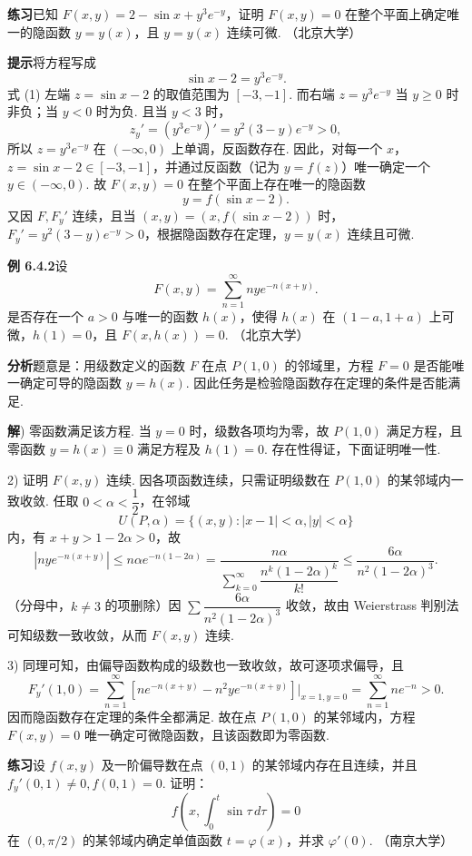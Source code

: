 \documentclass[UTF8, 12pt, fontset=fandol, oneside]{ctexart}
\begin{document}
\noindent\textbf{练习}\quad 已知 $F(x,y)=2-\sin x+y^3e^{-y}$，证明 $F(x,y)=0$ 在整个平面上确定唯一的隐函数 $y=y(x)$，且 $y=y(x)$ 连续可微. （北京大学）

\noindent\textbf{提示}\quad 将方程写成
\begin{equation}
  \sin x-2=y^3e^{-y}.
\end{equation}
式 (1) 左端 $z=\sin x-2$ 的取值范围为 $[-3,-1]$. 而右端 $z=y^3e^{-y}$ 当 $y\ge0$ 时非负；当 $y<0$ 时为负. 且当 $y<3$ 时，
\[
  z_y'=(y^3e^{-y})'=y^2(3-y)e^{-y}>0,
\]
所以 $z=y^3e^{-y}$ 在 $(-\infty,0)$ 上单调，反函数存在. 因此，对每一个 $x$，$z=\sin x-2\in[-3,-1]$，并通过反函数（记为 $y=f(z)$）唯一确定一个 $y\in(-\infty,0)$. 故 $F(x,y)=0$ 在整个平面上存在唯一的隐函数
\[
  y=f(\sin x-2).
\]
又因 $F,F_y'$ 连续，且当 $(x,y)=(x,f(\sin x-2))$ 时，$F_y'=y^2(3-y)e^{-y}>0$，根据隐函数存在定理，$y=y(x)$ 连续且可微.

\noindent\textbf{例 6.4.2}\quad 设
\[
  F(x,y)=\sum_{n=1}^\infty nye^{-n(x+y)}.
\]
是否存在一个 $a>0$ 与唯一的函数 $h(x)$，使得 $h(x)$ 在 $(1-a,1+a)$ 上可微，$h(1)=0$，且 $F(x,h(x))=0$. （北京大学）

\noindent\textbf{分析}\quad 题意是：用级数定义的函数 $F$ 在点 $P(1,0)$ 的邻域里，方程 $F=0$ 是否能唯一确定可导的隐函数 $y=h(x)$. 因此任务是检验隐函数存在定理的条件是否能满足.

\noindent\textbf{解}) 零函数满足该方程. 当 $y=0$ 时，级数各项均为零，故 $P(1,0)$ 满足方程，且零函数 $y=h(x)\equiv0$ 满足方程及 $h(1)=0$. 存在性得证，下面证明唯一性.

2) 证明 $F(x,y)$ 连续. 因各项函数连续，只需证明级数在 $P(1,0)$ 的某邻域内一致收敛. 任取 $0<\alpha<\dfrac12$，在邻域
\[
  U(P,\alpha)=\{(x,y):|x-1|<\alpha,|y|<\alpha\}
\]
内，有 $x+y>1-2\alpha>0$，故
\[
  |nye^{-n(x+y)}|
  \le n\alpha e^{-n(1-2\alpha)}
  =
  \frac{n\alpha}{\sum_{k=0}^\infty\dfrac{n^k(1-2\alpha)^k}{k!}}
  \le
  \frac{6\alpha}{n^2(1-2\alpha)^3}.
\]
（分母中，$k\ne3$ 的项删除）因 $\sum\dfrac{6\alpha}{n^2(1-2\alpha)^3}$ 收敛，故由 Weierstrass 判别法可知级数一致收敛，从而 $F(x,y)$ 连续.

3) 同理可知，由偏导函数构成的级数也一致收敛，故可逐项求偏导，且
\[
  F_y'(1,0)
  =
  \sum_{n=1}^\infty
  \left[
    ne^{-n(x+y)}-n^2ye^{-n(x+y)}
  \right]\bigg|_{x=1,y=0}
  =
  \sum_{n=1}^\infty ne^{-n}>0.
\]
因而隐函数存在定理的条件全都满足. 故在点 $P(1,0)$ 的某邻域内，方程 $F(x,y)=0$ 唯一确定可微隐函数，且该函数即为零函数.

\noindent\textbf{练习}\quad 设 $f(x,y)$ 及一阶偏导数在点 $(0,1)$ 的某邻域内存在且连续，并且 $f_y'(0,1)\ne0,f(0,1)=0$. 证明：
\[
  f\left(x,\int_0^t\sin\tau\,d\tau\right)=0
\]
在 $(0,\pi/2)$ 的某邻域内确定单值函数 $t=\varphi(x)$，并求 $\varphi'(0)$. （南京大学）
\end{document}
